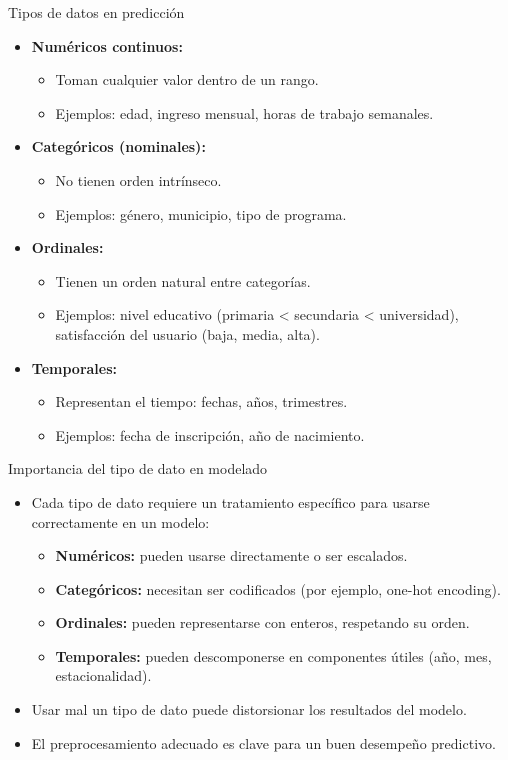 \documentclass{beamer}
\begin{document}
\begin{frame}{Tipos de datos en predicción}
	\begin{itemize}
		\item \textbf{Numéricos continuos:}
		\begin{itemize}
			\item Toman cualquier valor dentro de un rango.
			\item Ejemplos: edad, ingreso mensual, horas de trabajo semanales.
		\end{itemize}
		
		\item \textbf{Categóricos (nominales):}
		\begin{itemize}
			\item No tienen orden intrínseco.
			\item Ejemplos: género, municipio, tipo de programa.
		\end{itemize}
		
		\item \textbf{Ordinales:}
		\begin{itemize}
			\item Tienen un orden natural entre categorías.
			\item Ejemplos: nivel educativo (primaria < secundaria < universidad), satisfacción del usuario (baja, media, alta).
		\end{itemize}
		
		\item \textbf{Temporales:}
		\begin{itemize}
			\item Representan el tiempo: fechas, años, trimestres.
			\item Ejemplos: fecha de inscripción, año de nacimiento.
		\end{itemize}
	\end{itemize}
\end{frame}

\begin{frame}{Importancia del tipo de dato en modelado}
	\begin{itemize}
		\item Cada tipo de dato requiere un tratamiento específico para usarse correctamente en un modelo:
		\begin{itemize}
			\item \textbf{Numéricos:} pueden usarse directamente o ser escalados.
			\item \textbf{Categóricos:} necesitan ser codificados (por ejemplo, one-hot encoding).
			\item \textbf{Ordinales:} pueden representarse con enteros, respetando su orden.
			\item \textbf{Temporales:} pueden descomponerse en componentes útiles (año, mes, estacionalidad).
		\end{itemize}
		\item Usar mal un tipo de dato puede distorsionar los resultados del modelo.
		\item El preprocesamiento adecuado es clave para un buen desempeño predictivo.
	\end{itemize}
\end{frame}
\end{document}

